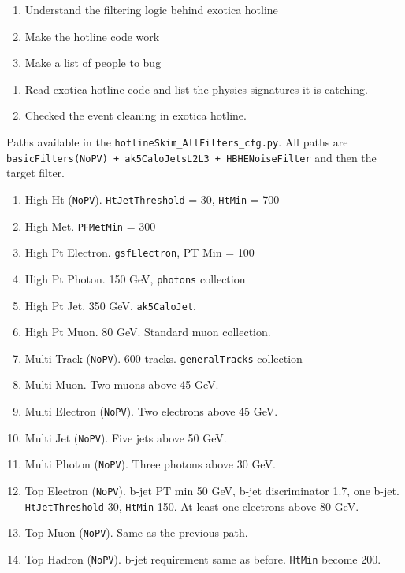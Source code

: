 

\begin{enumerate}
\item Understand the filtering logic behind exotica hotline
\item Make the hotline code work
\item Make a list of people to bug
\end{enumerate}


\begin{enumerate}
\item Read exotica hotline code and list the physics signatures it is catching.
\item Checked the event cleaning in exotica hotline.
\end{enumerate}



Paths available in the \texttt{hotlineSkim\_AllFilters\_cfg.py}.
All paths are \texttt{basicFilters(NoPV) + ak5CaloJetsL2L3 + HBHENoiseFilter} and then
the target filter.

\begin{enumerate}
\item High Ht (\texttt{NoPV}).  \texttt{HtJetThreshold} = 30, \texttt{HtMin} = 700
\item High Met.  \texttt{PFMetMin} = 300
\item High Pt Electron.  \texttt{gsfElectron}, PT Min = 100
\item High Pt Photon.  150 GeV, \texttt{photons} collection
\item High Pt Jet.  350 GeV.  \texttt{ak5CaloJet}.
\item High Pt Muon.  80 GeV.  Standard muon collection.
\item Multi Track (\texttt{NoPV}).  600 tracks.  \texttt{generalTracks} collection
\item Multi Muon.  Two muons above 45 GeV.
\item Multi Electron (\texttt{NoPV}).  Two electrons above 45 GeV.
\item Multi Jet (\texttt{NoPV}).  Five jets above 50 GeV.
\item Multi Photon (\texttt{NoPV}).  Three photons above 30 GeV.
\item Top Electron (\texttt{NoPV}).  b-jet PT min 50 GeV, b-jet discriminator 1.7, one b-jet.
\texttt{HtJetThreshold} 30, \texttt{HtMin} 150.  At least one electrons above 80 GeV.
\item Top Muon (\texttt{NoPV}).  Same as the previous path.
\item Top Hadron (\texttt{NoPV}).  b-jet requirement same as before.  \texttt{HtMin} become 200.
\end{enumerate}


